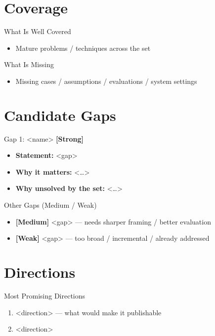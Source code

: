 \documentclass[aspectratio=169]{beamer}
\begin{document}
\section{Coverage}
\begin{frame}{What Is Well Covered}
  \begin{itemize}
    \item Mature problems / techniques across the set
  \end{itemize}
\end{frame}

\begin{frame}{What Is Missing}
  \begin{itemize}
    \item Missing cases / assumptions / evaluations / system settings
  \end{itemize}
\end{frame}

\section{Candidate Gaps}
\begin{frame}{Gap 1: <name> \hfill \textbf{[Strong]}}
  \begin{itemize}
    \item \textbf{Statement:} <gap>
    \item \textbf{Why it matters:} <\dots>
    \item \textbf{Why unsolved by the set:} <\dots>
  \end{itemize}
\end{frame}

\begin{frame}{Other Gaps (Medium / Weak)}
  \begin{itemize}
    \item \textbf{[Medium]} <gap> --- needs sharper framing / better evaluation
    \item \textbf{[Weak]} <gap> --- too broad / incremental / already addressed
  \end{itemize}
\end{frame}

\section{Directions}
\begin{frame}{Most Promising Directions}
  \begin{enumerate}
    \item <direction> --- what would make it publishable
    \item <direction>
  \end{enumerate}
\end{frame}
\end{document}

